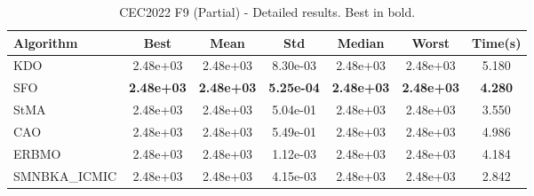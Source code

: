 \begin{table}[H]
\centering\small
\caption{CEC2022 F9 (Partial) - Detailed results. Best in bold.}
\label{tab:cec2022_F9}
\begin{tabular}{lcccccc}
\toprule
\textbf{Algorithm} & \textbf{Best} & \textbf{Mean} & \textbf{Std} & \textbf{Median} & \textbf{Worst} & \textbf{Time(s)} \\
\midrule
KDO & 2.48e+03 & 2.48e+03 & 8.30e-03 & 2.48e+03 & 2.48e+03 & 5.180 \\
SFO & \textbf{2.48e+03} & \textbf{2.48e+03} & \textbf{5.25e-04} & \textbf{2.48e+03} & \textbf{2.48e+03} & \textbf{4.280} \\
StMA & 2.48e+03 & 2.48e+03 & 5.04e-01 & 2.48e+03 & 2.48e+03 & 3.550 \\
CAO & 2.48e+03 & 2.48e+03 & 5.49e-01 & 2.48e+03 & 2.48e+03 & 4.986 \\
ERBMO & 2.48e+03 & 2.48e+03 & 1.12e-03 & 2.48e+03 & 2.48e+03 & 4.184 \\
SMNBKA_ICMIC & 2.48e+03 & 2.48e+03 & 4.15e-03 & 2.48e+03 & 2.48e+03 & 2.842 \\
\bottomrule
\end{tabular}
\end{table}
